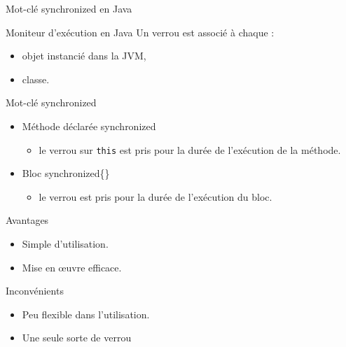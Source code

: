 
\begingroup

\begin{frame}{Mot-clé \alert{synchronized} en Java}

  \begin{alertblock}{Moniteur d'exécution en Java}
    Un \alert{verrou} est associé à chaque :
    \begin{itemize}
    \item objet instancié dans la JVM,
    \item classe.
    \end{itemize}
  \end{alertblock}
  
  \begin{block}{Mot-clé \alert{synchronized}}
    \begin{itemize}
    \item Méthode  déclarée \alert{synchronized}
      \begin{itemize}
      \item le verrou sur \lstinline{this} est pris pour la durée de l'exécution de la méthode. 
      \end{itemize}
    \item Bloc \alert{synchronized\{\}}
      \begin{itemize}
      \item le verrou est pris pour la durée de l'exécution du bloc.
      \end{itemize}
    \end{itemize}
  \end{block}

  \pause

  \begin{minipage}{.47\textwidth}
    \begin{exampleblock}{Avantages}
      \begin{itemize}
      \item Simple d'utilisation.
      \item Mise en \oe uvre efficace.
      \end{itemize}
    \end{exampleblock}
  \end{minipage}
  \hfill
  \begin{minipage}{.47\textwidth}
    \begin{alertblock}{Inconvénients}
      \begin{itemize}
      \item Peu flexible dans l'utilisation.
      \item Une seule sorte de verrou 
      \end{itemize}
    \end{alertblock}
  \end{minipage}

\end{frame}

\endgroup
\endinput

